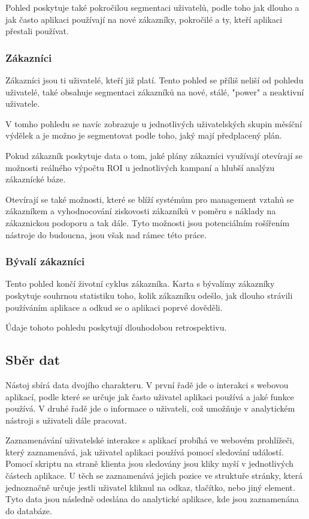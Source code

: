 \documentclass[bc,female,java,dept456]{diploma}						%
\begin{document}
Pohled poskytuje také pokročilou segmentaci uživatelů, podle toho jak dlouho a jak často aplikaci používají na nové zákazníky, pokročilé a ty, kteří aplikaci přestali používat.

\subsubsection{Zákazníci}

Zákazníci jsou ti uživatelé, kteří již platí. Tento pohled se příliš neliší od pohledu uživatelé, také obsahuje segmentaci zákazníků na nové, stálé, "power" a neaktivní uživatele.

V tomho pohledu se navíc zobrazuje u jednotlivých uživatelských skupin měsíční výdělek a je možno je segmentovat podle toho, jaký mají předplacený plán. 

Pokud zákazník poskytuje data o tom, jaké plány zákazníci využívají otevírají se možnosti reálného výpočtu ROI u jednotlivých kampaní a hlubší analýzu zákaznícké báze.

Otevírají se také možnosti, které se blíží systémům pro management vztahů se zákazníkem a vyhodnocování ziskovosti zákazníků v poměru s náklady na zákaznickou podoporu a tak dále. Tyto možnosti jsou potenciálním rošířením nástroje do budoucna, jsou však nad rámec této práce.


\subsubsection{Bývalí zákazníci}

Tento pohled končí životní cyklus zákazníka. Karta s bývalímy zákazníky poskytuje souhrnou statistiku toho, kolik zákazníku odešlo, jak dlouho strávili používáním aplikace a odkud se o aplikaci poprvé dověděli.

Údaje tohoto pohledu poskytují dlouhodobou retrospektivu.


\subsection{Sběr dat}

Nástoj sbírá data dvojího charakteru. V první řadě jde o interakci s webovou aplikací, podle které se určuje jak často uživatel aplikaci používá a jaké funkce používá. V druhé řadě jde o informace o uživateli, což umožňuje v analytickém nástroji s uživateli dále pracovat.

Zaznamenávání uživatelské interakce s aplikací probíhá ve webovém prohlížeči, který zaznamenává, jak uživatel aplikaci používá pomocí sledování událostí. Pomocí skriptu na straně klienta jsou sledovány jsou kliky myší v jednotlivých částech aplikace. U těch se zaznamenává jejich pozice ve struktuře stránky, která jednoznačně určuje jestli uživatel kliknul na odkaz, tlačítko, nebo jiný element. Tyto data jsou následně odeslána do analytické aplikace, kde jsou zaznamenána do databáze.
\end{document}
